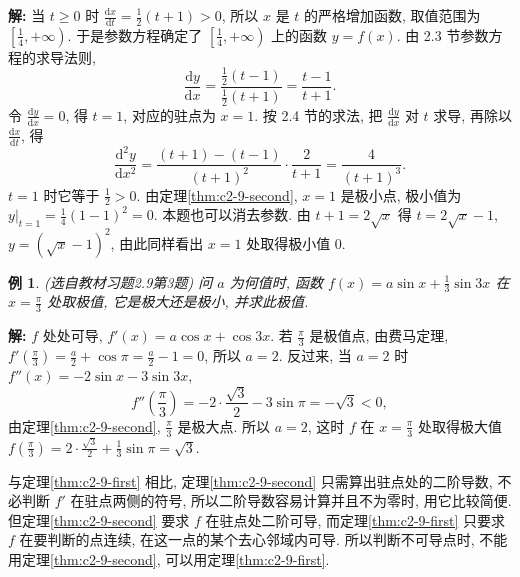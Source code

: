 \documentclass[UTF8,openany]{ctexbook}
\theoremstyle{chinesetextbook}
\newtheorem{example}{例}[section]
\newenvironment{cnsolution}{\par\indent\textbf{解:} \ignorespaces}{\par}
\newcommand{\dd}{\mathrm d}
\begin{document}
\begin{cnsolution}
当 $t\ge0$ 时 $\displaystyle\frac{\dd x}{\dd t}=\frac12(t+1)>0$, 所以 $x$ 是 $t$ 的严格增加函数, 取值范围为 $\displaystyle\left[\frac14,+\infty\right)$. 于是参数方程确定了 $\displaystyle\left[\frac14,+\infty\right)$ 上的函数 $y=f(x)$. 由 2.3 节参数方程的求导法则,
\[
\frac{\dd y}{\dd x}=\frac{\frac12(t-1)}{\frac12(t+1)}=\frac{t-1}{t+1}.
\]
令 $\displaystyle\frac{\dd y}{\dd x}=0$, 得 $t=1$, 对应的驻点为 $x=1$. 按 2.4 节的求法, 把 $\displaystyle\frac{\dd y}{\dd x}$ 对 $t$ 求导, 再除以 $\displaystyle\frac{\dd x}{\dd t}$, 得
\[
\frac{\dd^2y}{\dd x^2}=\frac{(t+1)-(t-1)}{(t+1)^2}\cdot\frac2{t+1}=\frac4{(t+1)^3}.
\]
$t=1$ 时它等于 $\displaystyle\frac12>0$. 由定理\ref{thm:c2-9-second}, $x=1$ 是极小点, 极小值为 $\displaystyle y\Big|_{t=1}=\frac14(1-1)^2=0$. 本题也可以消去参数. 由 $t+1=2\sqrt x$ 得 $t=2\sqrt x-1$, $y=(\sqrt x-1)^2$, 由此同样看出 $x=1$ 处取得极小值 $0$.
\end{cnsolution}
\begin{example}\label{ex:c2-h9-3}
\textnormal{(选自教材习题2.9第3题)} 问 $a$ 为何值时, 函数 $\displaystyle f(x)=a\sin x+\frac13\sin3x$ 在 $\displaystyle x=\frac\pi3$ 处取极值, 它是极大还是极小, 并求此极值.
\end{example}
\begin{cnsolution}
$f$ 处处可导, $f'(x)=a\cos x+\cos3x$. 若 $\displaystyle\frac\pi3$ 是极值点, 由费马定理, $\displaystyle f'\left(\frac\pi3\right)=\frac a2+\cos\pi=\frac a2-1=0$, 所以 $a=2$. 反过来, 当 $a=2$ 时 $f''(x)=-2\sin x-3\sin3x$,
\[
f''\left(\frac\pi3\right)=-2\cdot\frac{\sqrt3}2-3\sin\pi=-\sqrt3<0,
\]
由定理\ref{thm:c2-9-second}, $\displaystyle\frac\pi3$ 是极大点. 所以 $a=2$, 这时 $f$ 在 $\displaystyle x=\frac\pi3$ 处取得极大值 $\displaystyle f\left(\frac\pi3\right)=2\cdot\frac{\sqrt3}2+\frac13\sin\pi=\sqrt3$.
\end{cnsolution}
与定理\ref{thm:c2-9-first} 相比, 定理\ref{thm:c2-9-second} 只需算出驻点处的二阶导数, 不必判断 $f'$ 在驻点两侧的符号, 所以二阶导数容易计算并且不为零时, 用它比较简便. 但定理\ref{thm:c2-9-second} 要求 $f$ 在驻点处二阶可导, 而定理\ref{thm:c2-9-first} 只要求 $f$ 在要判断的点连续, 在这一点的某个去心邻域内可导. 所以判断不可导点时, 不能用定理\ref{thm:c2-9-second}, 可以用定理\ref{thm:c2-9-first}.
\end{document}
